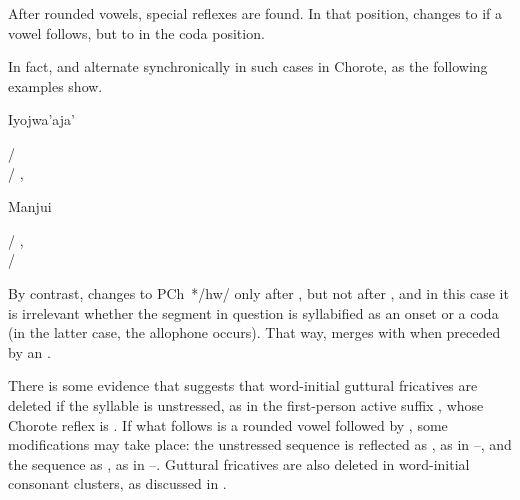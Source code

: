 After rounded vowels, special reflexes are found. In that position,  changes to  if a vowel follows, but to  in the coda position.

\begin{exe}
    \ex \najendup
    \ex \centipede
    \ex \many
    \ex \deep
    \ex \far
    \ex \largefat
    \ex \snakeatuj
\end{exe}

In fact,  and  alternate synchronically in such cases in Chorote, as the following examples show.

\ea\label{ex:h-hw:i'w}
Iyojwa'aja' \citep[152, 157]{ND09}
    \begin{xlist}
        \ex {} / \\
        \ex {} / , 
    \end{xlist}
\z

\ea\label{ex:h-hw:mj}
Manjui \citep{JC18}
    \begin{xlist}
        \ex {} / , \\
        \ex {} / \\
    \end{xlist}
\z
{}

By contrast,  changes to PCh~*/hw/ only after , but not after , and in this case it is irrelevant whether the segment in question is syllabified as an onset or a coda (in the latter case, the allophone  occurs). That way,  merges with  when preceded by an .

\begin{exe}
    \ex \eatvt
    \ex \aunt
\end{exe}

There is some evidence that suggests that word-initial guttural fricatives are deleted if the syllable is unstressed, as in the first-person active suffix , whose Chorote reflex is . If what follows is a rounded vowel followed by , some modifications may take place: the unstressed sequence  is reflected as , as in --, and the sequence  as , as in --. Guttural fricatives are also deleted in word-initial consonant clusters, as discussed in .


